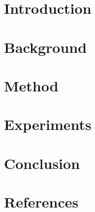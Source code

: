 \documentclass{article}
\begin{document}
\section{Introduction}

\section{Background}

\section{Method}

\section{Experiments}

\section{Conclusion}

\section*{References}

\printbibliography
\end{document}
